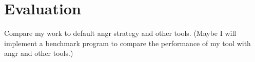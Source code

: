 \chapter{Evaluation}

Compare my work to default angr strategy and other tools. (Maybe I will implement a benchmark program to compare the performance of my tool with angr and other tools.)

